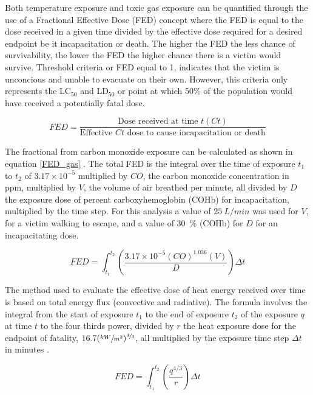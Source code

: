 \documentclass[12pt,oneside]{book}
\begin{document}
Both temperature exposure and toxic gas exposure can be quantified through the use of a Fractional Effective Dose (FED) concept where the FED is equal to the dose received in a given time divided by the effective dose required for a desired endpoint be it incapacitation or death. The higher the FED the less chance of survivability, the lower the FED the higher chance there is a victim would survive. Threshold criteria or FED equal to 1, indicates that the victim is unconcious and unable to evacuate on their own. However, this criteria only represents the LC$_{50}$ and LD$_{50}$ or point at which 50\% of the population would have received a potentially fatal dose.

\begin{equation}
	FED = \frac{\text{Dose received at time } t(Ct)}{\text{Effective } Ct \text{ dose to cause incapacitation or death}}
	\label{FED_general}
\end{equation} 

The fractional from carbon monoxide exposure can be calculated as shown in equation \ref{FED_gas} \cite{SFPE:Purser}. The total FED is the integral over the time of exposure $t_1$ to $t_2$ of $3.17 \times  10^{-5}$ multiplied by $CO$, the carbon monoxide concentration in ppm, multiplied by $V$, the volume of air breathed per minute, all divided by $D$ the exposure dose of percent carboxyhemoglobin (COHb) for incapacitation, multiplied by the time step. For this analysis a value of $25~L/min$ was used for $V$, for a victim walking to escape, and a value of 30~\% (COHb) for $D$ for an incapacitating dose.

\begin{equation}
	FED = \int_{t_1}^{t_2}\left(\frac{3.17 \times 10^{-5} \left(CO\right)^{1.036} \left(V\right)}{D}\right) \Delta t
	\label{FED_gas}
\end{equation}

The method used to evaluate the effective dose of heat energy received over time is based on total energy flux (convective and radiative). The formula involves the integral from the start of exposure $t_1$ to the end of exposure $t_2$ of the exposure $q$ at time $t$ to the four thirds power, divided by $r$ the heat exposure dose for the endpoint of fatality, $16.7(\sfrac{kW}{m^2})^{\sfrac{4}{3}}$, all multiplied by the exposure time step $\Delta t$ in minutes \cite{SFPE:Purser}.

\begin{equation} \label{TotalFlux_FED}
	FED = \int_{t_1}^{t_2} \left( \frac{q^{4/3}}{r} \right) \Delta t
\end{equation}
\end{document}
